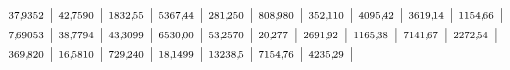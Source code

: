 \documentclass[12pt,fleqn]{article}
\theoremstyle{aufg}
\theoremstyle{bsp}
\begin{document}
\begin{flushleft}
$ \scriptstyle37,\hspace{-1pt}9352$ | $ \scriptstyle42,\hspace{-1pt}7590$ | $ \scriptstyle1832,\hspace{-1pt}55$ | $ \scriptstyle5367,\hspace{-1pt}44$ | $ \scriptstyle281,\hspace{-1pt}250$ | $ \scriptstyle808,\hspace{-1pt}980$ | $ \scriptstyle352,\hspace{-1pt}110$ | $ \scriptstyle4095,\hspace{-1pt}42$ | $ \scriptstyle3619,\hspace{-1pt}14$ | $ \scriptstyle1154,\hspace{-1pt}66$ | $ \scriptstyle7,\hspace{-1pt}69053$ | $ \scriptstyle38,\hspace{-1pt}7794$ | $ \scriptstyle43,\hspace{-1pt}3099$ | $ \scriptstyle6530,\hspace{-1pt}00$ | $ \scriptstyle53,\hspace{-1pt}2570$ | $ \scriptstyle20,\hspace{-1pt}277$ | $ \scriptstyle2691,\hspace{-1pt}92$ | $ \scriptstyle1165,\hspace{-1pt}38$ | $ \scriptstyle7141,\hspace{-1pt}67$ | $ \scriptstyle2272,\hspace{-1pt}54$ | $ \scriptstyle369,\hspace{-1pt}820$ | $ \scriptstyle16,\hspace{-1pt}5810$ | $ \scriptstyle729,\hspace{-1pt}240$ | $ \scriptstyle18,\hspace{-1pt}1499$ | $ \scriptstyle13238,\hspace{-1pt}5$ | $ \scriptstyle7154,\hspace{-1pt}76$ | $ \scriptstyle4235,\hspace{-1pt}29$ | \end{flushleft} 
\end{document}
